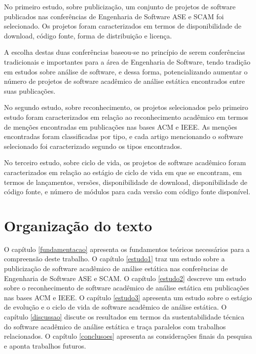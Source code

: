 No primeiro estudo, sobre publicização, um conjunto de projetos de software publicados
nas conferências de Engenharia de Software ASE e SCAM foi selecionado. Os projetos foram
caracterizados em termos de disponibilidade de download, código fonte, forma de
distribuição e licença.

A escolha destas duas conferências baseou-se no princípio de serem conferências
tradicionais e importantes para a área de Engenharia de Software, tendo tradição
em estudos sobre análise de software, e dessa forma, potencializando aumentar
o número de projetos de software acadêmico de análise estática encontrados
entre suas publicações.

No segundo estudo, sobre reconhecimento, os projetos selecionados pelo primeiro estudo
foram caracterizados em relação ao
reconhecimento acadêmico em termos de menções encontradas em publicações nas
bases ACM e IEEE. As menções encontradas foram classificadas por tipo, e cada artigo
mencionando o software selecionado foi caracterizado segundo os tipos encontrados.

No terceiro estudo, sobre ciclo de vida, os projetos de software acadêmico foram caracterizados em
relação ao estágio de ciclo de vida em que se encontram, em termos de lançamentos, versões, disponibilidade de
download, disponibilidade de código fonte, e número de módulos
para cada versão com código fonte disponível.

\section{Organização do texto}

O capítulo \ref{fundamentacao} apresenta os fundamentos teóricos necessários
para a compreensão deste trabalho.
O capítulo \ref{estudo1} traz um estudo sobre a publicização de software
acadêmico de análise estática nas conferências de Engenharia de Software ASE e
SCAM.
O capítulo \ref{estudo2} descreve um estudo sobre o reconhecimento de software
acadêmico de análise estática em publicações nas bases ACM e IEEE.
O capítulo \ref{estudo3} apresenta um estudo sobre o estágio de evolução e o
ciclo de vida de software acadêmico de análise estática.
O capítulo \ref{discussao} discute os resultados em termos da sustentabilidade
técnica do software acadêmico de análise estática e traça
paralelos com trabalhos relacionados.
O capítulo \ref{conclusoes} apresenta as considerações finais da pesquisa e
aponta trabalhos futuros.


